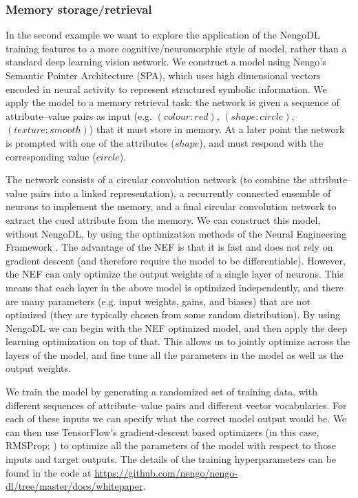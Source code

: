 \documentclass{article}
\begin{document}
\subsubsection{Memory storage/retrieval}

In the second example we want to explore the application of the NengoDL training features to a more cognitive/neuromorphic style of model, rather than a standard deep learning vision network.  We construct a model using Nengo's Semantic Pointer Architecture (SPA), which uses high dimensional vectors encoded in neural activity to represent structured symbolic information.  We apply the model to a memory retrieval task: the network is given a sequence of attribute--value pairs as input (e.g. $(colour: red)$, $(shape: circle)$, $(texture: smooth)$) that it must store in memory.  At a later point the network is prompted with one of the attributes ($shape$), and must respond with the corresponding value ($circle$).  

The network consists of a circular convolution network (to combine the attribute--value pairs into a linked representation), a recurrently connected ensemble of neurons to implement the memory, and a final circular convolution network to extract the cued attribute from the memory.  We can construct this model, without NengoDL, by using the optimization methods of the Neural Engineering Framework \citep[NEF;][]{Eliasmith2005}.  The advantage of the NEF is that it is fast and does not rely on gradient descent (and therefore require the model to be differentiable).  However, the NEF can only optimize the output weights of a single layer of neurons.  This means that each layer in the above model is optimized independently, and there are many parameters (e.g. input weights, gains, and biases) that are not optimized (they are typically chosen from some random distribution).  By using NengoDL we can begin with the NEF optimized model, and then apply the deep learning optimization on top of that.  This allows us to jointly optimize across the layers of the model, and fine tune all the parameters in the model as well as the output weights.

We train the model by generating a randomized set of training data, with different sequences of attribute--value pairs and different vector vocabularies.  For each of these inputs we can specify what the correct model output would be.  We can then use TensorFlow's gradient-descent based optimizers (in this case, RMSProp; \citealt{Tieleman2012}) to optimize all the parameters of the model with respect to those inputs and target outputs.  The details of the training hyperparameters can be found in the code at \url{https://github.com/nengo/nengo-dl/tree/master/docs/whitepaper}.
\end{document}
